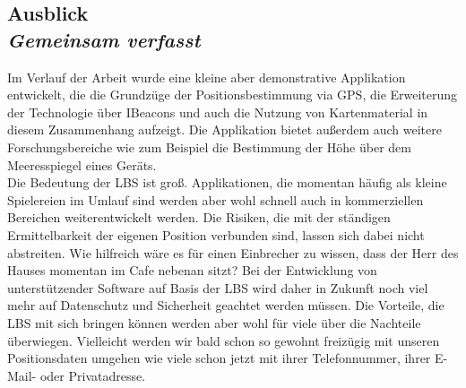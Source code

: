 \subsection[Ausblick]{Ausblick
 \\ \textnormal{\small{\textit {Gemeinsam verfasst}}}}
Im Verlauf der Arbeit wurde eine kleine aber demonstrative Applikation entwickelt, die die Grundzüge der Positionsbestimmung via GPS, die Erweiterung der Technologie über IBeacons und auch die Nutzung von Kartenmaterial in diesem Zusammenhang aufzeigt. Die Applikation bietet außerdem auch weitere Forschungsbereiche wie zum Beispiel die Bestimmung der Höhe über dem Meeresspiegel eines Geräts.
\\
Die Bedeutung der LBS ist groß. Applikationen, die momentan häufig als kleine Spielereien im Umlauf sind werden aber wohl schnell auch in kommerziellen Bereichen weiterentwickelt werden. Die Risiken, die mit der ständigen Ermittelbarkeit der eigenen Position verbunden sind, lassen sich dabei nicht abstreiten. Wie hilfreich wäre es für einen Einbrecher zu wissen, dass der Herr des Hauses momentan im Cafe nebenan sitzt? Bei der Entwicklung von unterstützender Software auf Basis der LBS wird daher in Zukunft noch viel mehr auf Datenschutz und Sicherheit geachtet werden müssen. Die Vorteile, die LBS mit sich bringen können werden aber wohl für viele über die Nachteile überwiegen. Vielleicht werden wir bald schon so gewohnt freizügig mit unseren Positionsdaten umgehen wie viele schon jetzt mit ihrer Telefonnummer, ihrer E-Mail- oder Privatadresse.